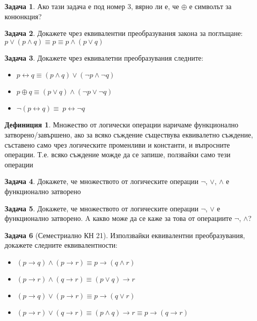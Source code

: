 \documentclass[10pt, a4paper]{article}
\theoremstyle{definition}
\newtheorem{definition}{Дефиниция}[section]
\newtheorem{problem}{Задача}
\theoremstyle{remark}
\begin{document}
\begin{problem}
    Ако тази задача е под номер 3, вярно ли е, че \(\oplus\) е символът за конюнкция?
\end{problem}

\begin{problem} Докажете чрез еквивалентни преобразувания закона за поглъщане: \(p\vee(p\wedge q)\equiv p\equiv p\wedge(p\vee q)\) \end{problem}

\begin{problem}
    Докажете чрез еквивалетни преобразувания следните:
    \begin{itemize}
        \item \(p \leftrightarrow q \equiv (p \wedge q) \vee (\neg p \wedge \neg q)\)
        \item \(p \oplus q \equiv (p \vee q) \wedge (\neg p \vee \neg q)\)
        \item \(\neg(p\leftrightarrow q)\equiv\ p\leftrightarrow \neg q\)
    \end{itemize}
\end{problem}

\hfill
\begin{definition}
    Множество от логически операции наричаме функционално затворено/завършено, ако за всяко съждение съществува еквивалетно съждение, съставено само чрез логическите променливи и константи, и въпросните операции. Т.е. всяко съждение можде да се запише, ползвайки само тези операции
\end{definition}

\begin{problem}
Докажете, че множеството от логическите операции \(\neg\), \(\vee\), \(\wedge\) е функционално затворено
\end{problem}

\begin{problem}
Докажете, че множеството от логическите операции \(\neg\), \(\vee\) е функционално затворено. A какво може да се каже за това от операциите \(\neg\), \(\wedge\)?
\end{problem}

\begin{problem}[Семестриално КН 21]  Използвайки еквивалентни преобразувания, докажете следните еквивалентности: 
    \begin{itemize}
        \item \((p \rightarrow q) \wedge (p \rightarrow r) \equiv p \rightarrow (q \wedge r)\)
        \item \((p \rightarrow r) \wedge (q \rightarrow r) \equiv (p \vee q) \rightarrow r\)
        \item \((p \rightarrow q) \vee (p \rightarrow r) \equiv p \rightarrow (q \vee r)\)
        \item \((p \rightarrow r) \vee (q \rightarrow r) \equiv (p \wedge q) \rightarrow r \equiv p \rightarrow (q \rightarrow r)\) 
    \end{itemize}
\end{problem}
\end{document}

